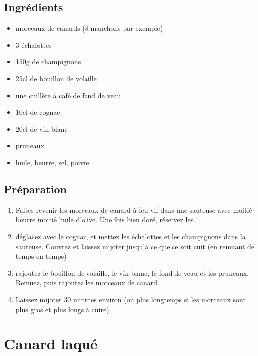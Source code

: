 \subsection*{Ingrédients}
\begin{itemize}
\item morceaux de canards (8 manchons par exemple)
\item 3 échalottes
\item 150g de champignons
\item 25cl de bouillon de volaille
\item une cuillère à café de fond de veau
\item 10cl de cognac
\item 20cl de vin blanc
\item pruneaux
\item huile, beurre, sel, poivre
\end{itemize}

\subsection*{Préparation}
\begin{enumerate}
\item Faites revenir les morceaux de canard à feu vif dans une sauteuse avec moitié beurre moitié huile d'olive. Une fois bien doré, réservez les.
\item déglacez avec le cognac, et mettez les échalottes et les champignons dans la sauteuse. Couvrez et laissez mijoter jusqu'à ce que ce soit cuit (en remuant de temps en temps)
\item rajoutez le bouillon de volaille, le vin blanc, le fond de veau et les pruneaux. Remuez, puis rajoutez les morceaux de canard.
\item Laissez mijoter 30 minutes environ (ou plus longtemps si les morceaux sont plus gros et plus longs à cuire).
\end{enumerate}

\newpage
\section{Canard laqué}

